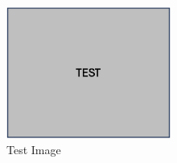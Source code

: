 \begin{figure}[htbp]
    \centering
    \includegraphics[width=0.48\textwidth,height=0.6\textheight,keepaspectratio]{fig/test.jpg}
    \caption{Test Image}
    \label{fig:test}
\end{figure}